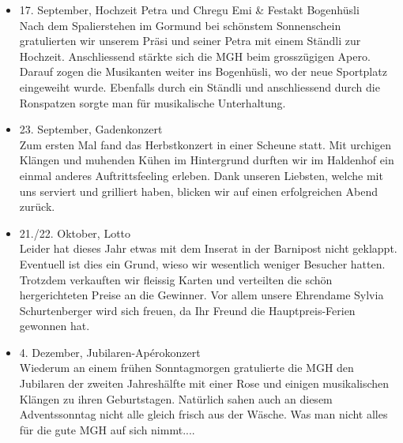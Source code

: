 \begin{history}
\begin{itemize}
        \item 17. September, Hochzeit Petra und Chregu Emi \& Festakt
              Bogenhüsli\\
              Nach dem Spalierstehen im Gormund bei schönstem Sonnenschein
              gratulierten wir unserem Präsi und seiner Petra mit einem Ständli zur
              Hochzeit. Anschliessend stärkte sich die MGH beim grosszügigen Apero.
              Darauf zogen die Musikanten weiter ins Bogenhüsli, wo der neue
              Sportplatz eingeweiht wurde. Ebenfalls durch ein Ständli und
              anschliessend durch die Ronspatzen sorgte man für musikalische
              Unterhaltung.

        \item 23. September, Gadenkonzert\\
              Zum ersten Mal fand das Herbstkonzert in einer Scheune statt. Mit
              urchigen Klängen und muhenden Kühen im Hintergrund durften wir im
              Haldenhof ein einmal anderes Auftrittsfeeling erleben. Dank unseren
              Liebsten, welche mit uns serviert und grilliert haben, blicken wir auf
              einen erfolgreichen Abend zurück.

        \item 21./22. Oktober, Lotto\\
              Leider hat dieses Jahr etwas mit dem Inserat in der Barnipost nicht
              geklappt. Eventuell ist dies ein Grund, wieso wir wesentlich weniger
              Besucher hatten. Trotzdem verkauften wir fleissig Karten und verteilten
              die schön hergerichteten Preise an die Gewinner. Vor allem unsere
              Ehrendame Sylvia Schurtenberger wird sich freuen, da Ihr Freund die
              Hauptpreis-Ferien gewonnen hat.

        \item 4. Dezember, Jubilaren-Apérokonzert\\
              Wiederum an einem frühen Sonntagmorgen gratulierte die MGH den Jubilaren
              der zweiten Jahreshälfte mit einer Rose und einigen musikalischen
              Klängen zu ihren Geburtstagen. Natürlich sahen auch an diesem
              Adventssonntag nicht alle gleich frisch aus der Wäsche. Was man nicht
              alles für die gute MGH auf sich nimmt....


    \end{itemize}

\end{history}
